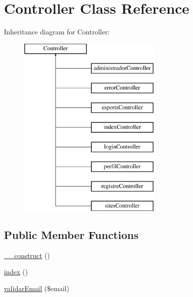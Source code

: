 \hypertarget{class_controller}{}\section{Controller Class Reference}
\label{class_controller}
Inheritance diagram for Controller\+:\begin{figure}[H]
\begin{center}
\leavevmode
\includegraphics[height=9.000000cm]{class_controller}
\end{center}
\end{figure}
\subsection*{Public Member Functions}
\begin{DoxyCompactItemize}
\item 
\hyperlink{class_controller_a095c5d389db211932136b53f25f39685}{\+\_\+\+\_\+construct} ()
\item 
\hyperlink{class_controller_a149eb92716c1084a935e04a8d95f7347}{index} ()
\item 
\hyperlink{class_controller_a0e73d4ad814de3b9b7a94912a6256df6}{validar\+Email} (\$email)
\end{DoxyCompactItemize}
